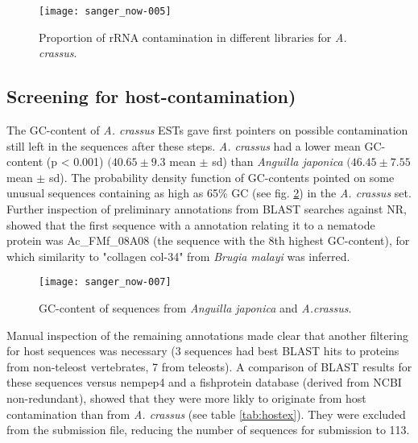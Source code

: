 \documentclass[12pt,a4paper]{article}
\begin{document}
\begin{figure}[H]
  \centering \advance\leftskip-2.275cm
\texttt{[image: sanger\_now-005]}
\caption{Proportion of rRNA contamination in different libraries for
  \textit{A. crassus}.}
\label{fig:rRNA}
\end{figure}


\subsection*{Screening for host-contamination)}

The GC-content of \textit{A. crassus} ESTs gave first pointers on
possible contamination still left in the sequences after these
steps. \textit{A. crassus} had a lower mean GC-content (p < 0.001)
$(40.65 \pm 9.3$
mean $\pm$ sd) than \textit{Anguilla japonica}
$(46.45 \pm 7.55$
mean $\pm$ sd). The probability density function of GC-contents
pointed on some unusual sequences containing as high as 65\% GC (see
fig. \ref{fig:GC}) in the \textit{A. crassus} set. Further inspection
of preliminary annotations from BLAST searches against NR, showed that
the first sequence with a annotation relating it to a nematode protein
was Ac\_FMf\_08A08 (the sequence with the 8th highest GC-content), for
which similarity to "collagen col-34" from \textit{Brugia malayi} was
inferred.

\begin{figure}[H]
  \centering \advance\leftskip-2.275cm
\texttt{[image: sanger\_now-007]}
\caption{GC-content of sequences from \textit{Anguilla japonica} and
  \textit{A.crassus}.}
\label{fig:GC}
\end{figure}

Manual inspection of the remaining annotations made clear that another
filtering for host sequences was necessary (3 sequences had best BLAST
hits to proteins from non-teleost vertebrates, 7 from teleosts). A
comparison of BLAST results for these sequences versus nempep4 and a
fishprotein database (derived from NCBI non-redundant), showed that
they were more likly to originate from host contamination than from
\textit{A. crassus} (see table \ref{tab:hostex}). They were excluded
from the submission file, reducing the number of sequences for
submission to 113.
\end{document}
